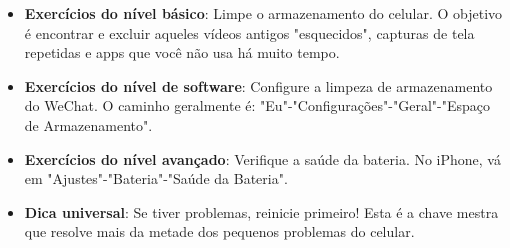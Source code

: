 
\begin{itemize}
  \item \textbf{Exercícios do nível básico}: Limpe o armazenamento do celular. O objetivo é encontrar e excluir aqueles vídeos antigos "esquecidos", capturas de tela repetidas e apps que você não usa há muito tempo.
  \item \textbf{Exercícios do nível de software}: Configure a limpeza de armazenamento do WeChat. O caminho geralmente é: "Eu"-"Configurações"-"Geral"-"Espaço de Armazenamento".
  \item \textbf{Exercícios do nível avançado}: Verifique a saúde da bateria. No iPhone, vá em "Ajustes"-"Bateria"-"Saúde da Bateria".
  \item \textbf{Dica universal}: Se tiver problemas, reinicie primeiro! Esta é a chave mestra que resolve mais da metade dos pequenos problemas do celular.
\end{itemize}
